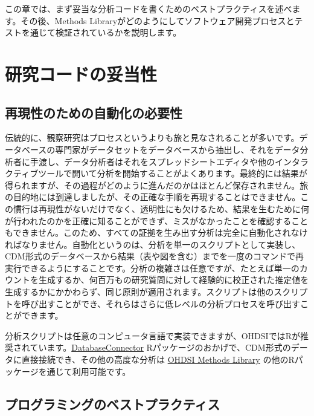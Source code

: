 \documentclass[
  11pt]{book}
\theoremstyle{definition}
\theoremstyle{definition}
\theoremstyle{definition}
\theoremstyle{definition}
\theoremstyle{remark}
\begin{document}
この章では、まず妥当な分析コードを書くためのベストプラクティスを述べます。その後、Methods Libraryがどのようにしてソフトウェア開発プロセスとテストを通じて検証されているかを説明します。 

\section{研究コードの妥当性}\label{ux7814ux7a76ux30b3ux30fcux30c9ux306eux59a5ux5f53ux6027}

\subsection{再現性のための自動化の必要性}\label{automation}

伝統的に、観察研究はプロセスというよりも旅と見なされることが多いです。データベースの専門家がデータセットをデータベースから抽出し、それをデータ分析者に手渡し、データ分析者はそれをスプレッドシートエディタや他のインタラクティブツールで開いて分析を開始することがよくあります。最終的には結果が得られますが、その過程がどのように進んだのかはほとんど保存されません。旅の目的地には到達しましたが、その正確な手順を再現することはできません。この慣行は再現性がないだけでなく、透明性にも欠けるため、結果を生むために何が行われたのかを正確に知ることができず、ミスがなかったことを確認することもできません。このため、すべての証拠を生み出す分析は完全に自動化されなければなりません。自動化というのは、分析を単一のスクリプトとして実装し、CDM形式のデータベースから結果（表や図を含む）までを一度のコマンドで再実行できるようにすることです。分析の複雑さは任意ですが、たとえば単一のカウントを生成するか、何百万もの研究質問に対して経験的に校正された推定値を生成するかにかかわらず、同じ原則が適用されます。スクリプトは他のスクリプトを呼び出すことができ、それらはさらに低レベルの分析プロセスを呼び出すことができます。

分析スクリプトは任意のコンピュータ言語で実装できますが、OHDSIではRが推奨されています。\href{https://ohdsi.github.io/DatabaseConnector/}{DatabaseConnector} Rパッケージのおかげで、CDM形式のデータに直接接続でき、その他の高度な分析は \href{https://ohdsi.github.io/MethodsLibrary/}{OHDSI Methods Library} の他のRパッケージを通じて利用可能です。

\subsection{プログラミングのベストプラクティス}\label{ux30d7ux30edux30b0ux30e9ux30dfux30f3ux30b0ux306eux30d9ux30b9ux30c8ux30d7ux30e9ux30afux30c6ux30a3ux30b9}
\end{document}
